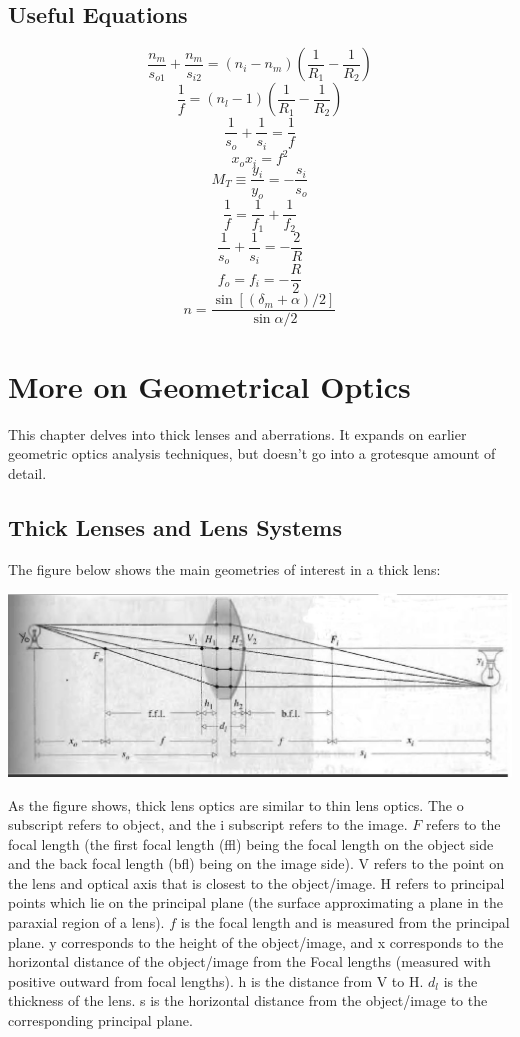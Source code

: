 \documentclass[12pt]{report}
\begin{document}
\section{Useful Equations}
\[\frac{n_m}{s_{o1}}+\frac{n_m}{s_{i2}} = (n_i-n_m)\left(\frac{1}{R_1}-\frac{1}{R_2}\right)\]
\[\frac{1}{f} = (n_l - 1)\left(\frac{1}{R_1}-\frac{1}{R_2}\right)\]
\[\frac{1}{s_o}+\frac{1}{s_i} = \frac{1}{f}\]
\[x_ox_i = f^2\]
\[M_T \equiv \frac{y_i}{y_o} = -\frac{s_i}{s_o}\]
\[\frac{1}{f} = \frac{1}{f_1}+\frac{1}{f_2}\]
\[\frac{1}{s_o}+\frac{1}{s_i} = -\frac{2}{R}\]
\[f_o = f_i = -\frac{R}{2} \]
\[n = \frac{\sin [(\delta_m+\alpha)/2]}{\sin \alpha/2}\]


\chapter{More on Geometrical Optics}
This chapter delves into thick lenses and aberrations. It expands on earlier geometric optics analysis techniques, but doesn't go into a grotesque amount of detail. 
\section{Thick Lenses and Lens Systems}
The figure below shows the main geometries of interest in a thick lens:

\includegraphics[scale=.35]{ThickLensGeometry.jpg}

As the figure shows, thick lens optics are similar to thin lens optics. The o subscript refers to object, and the i subscript refers to the image. $F$ refers to the focal length (the first focal length (ffl) being the focal length on the object side and the back focal length (bfl) being on the image side). V refers to the point on the lens and optical axis that is closest to the object/image. H refers to principal points which lie on the principal plane (the surface approximating a plane in the paraxial region of a lens). $f$ is the focal length and is measured from the principal plane. y corresponds to the height of the object/image,  and x corresponds to the horizontal distance of the object/image from the Focal lengths (measured with positive outward from focal lengths). h is the distance from V to H. $d_l$ is the thickness of the lens. s is the horizontal distance from the object/image to the corresponding principal plane. 
\end{document}
